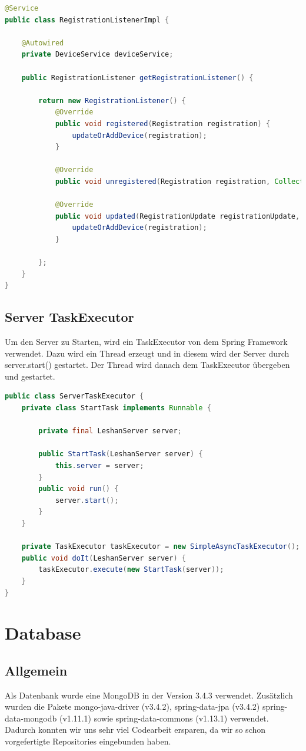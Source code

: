 \begin{lstlisting}[language=java]
@Service
public class RegistrationListenerImpl {

	@Autowired
	private DeviceService deviceService;

	public RegistrationListener getRegistrationListener() {

		return new RegistrationListener() {
			@Override
			public void registered(Registration registration) {
				updateOrAddDevice(registration);
			}

			@Override
			public void unregistered(Registration registration, Collection<Observation> observerColl) {}

			@Override
			public void updated(RegistrationUpdate registrationUpdate, Registration registration) {
				updateOrAddDevice(registration);
			}

		};
	}
}
\end{lstlisting}

\subsection{Server TaskExecutor}
Um den Server zu Starten, wird ein TaskExecutor von dem Spring Framework verwendet. Dazu wird ein Thread erzeugt und in diesem wird der Server durch server.start() gestartet. Der Thread wird danach dem TaskExecutor übergeben und gestartet.
\begin{lstlisting}[language=java]
public class ServerTaskExecutor {
	private class StartTask implements Runnable {

		private final LeshanServer server;

		public StartTask(LeshanServer server) {
			this.server = server;
		}
		public void run() {
			server.start();
		}
	}

	private TaskExecutor taskExecutor = new SimpleAsyncTaskExecutor();
	public void doIt(LeshanServer server) {
		taskExecutor.execute(new StartTask(server));
	}
}
\end{lstlisting}

\newpage

\section{Database}
\subsection{Allgemein}
Als Datenbank wurde eine MongoDB in der Version 3.4.3 verwendet. Zusätzlich wurden die Pakete mongo-java-driver (v3.4.2), spring-data-jpa (v3.4.2) spring-data-mongodb (v1.11.1) sowie spring-data-commons (v1.13.1) verwendet. Dadurch konnten wir uns sehr viel Codearbeit ersparen, da wir so schon vorgefertigte Repositories eingebunden haben.


